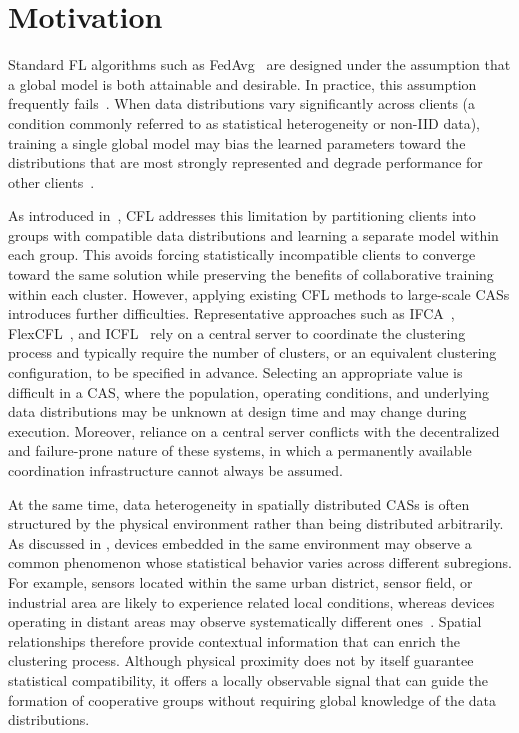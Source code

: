 \section{Motivation}
\label{sec:selforgfl-motivation}

Standard \gls{FL} algorithms such as 
 \gls{FedAvg}~\cite{DBLP:conf/aistats/McMahanMRHA17}
 are designed under the assumption that a global model 
 is both attainable and desirable.
%
In practice,
 this assumption frequently fails~\cite{DBLP:journals/ftml/KairouzMABBBBCC21}.
%
When data distributions vary significantly across clients
 (a condition commonly referred to as statistical heterogeneity or
 non-\gls{IID} data),
 training a single global model may bias the learned parameters toward
 the distributions that are most strongly represented and degrade
 performance for other clients~\cite{DBLP:conf/icde/LiDCH22}.

As introduced in~,
 \gls{CFL} addresses this limitation by partitioning clients
 into groups with compatible data distributions and learning a separate
 model within each group.
%
This avoids forcing statistically incompatible clients 
 to converge toward the same solution while preserving the benefits 
 of collaborative training within each cluster.
%
However, 
 applying existing \gls{CFL} methods to large-scale \glspl{CAS} 
 introduces further difficulties.
%
Representative approaches such as
 IFCA~\cite{DBLP:journals/tit/GhoshCYR22},
 FlexCFL~\cite{DBLP:journals/tpds/DuanLJWLCTR22}, and
 ICFL~\cite{DBLP:journals/tnn/YanTW24}
 rely on a central server to coordinate the clustering process 
 and typically require the number of clusters, 
 or an equivalent clustering configuration, to be specified in advance.
%
Selecting an appropriate value is difficult in a \gls{CAS}, 
 where the population, operating conditions, 
 and underlying data distributions may be unknown at design time 
 and may change during execution.
%
Moreover, 
 reliance on a central server conflicts with the decentralized
 and failure-prone nature of these systems, 
 in which a permanently available coordination infrastructure 
 cannot always be assumed.

At the same time, 
 data heterogeneity in spatially distributed \glspl{CAS} is often structured 
 by the physical environment rather than being distributed arbitrarily.
%
As discussed in ,
 devices embedded in the same environment may observe a common phenomenon
 whose statistical behavior varies across different subregions.
%
For example, 
 sensors located within the same urban district, sensor field, 
 or industrial area are likely to experience related local conditions, 
 whereas devices operating in distant areas may observe systematically different 
 ones~\cite{esterle2022deep}.
%
Spatial relationships therefore provide contextual information 
 that can enrich the clustering process.
%
Although physical proximity does not by itself guarantee statistical compatibility, 
 it offers a locally observable signal that can guide the formation 
 of cooperative groups without requiring global knowledge of the data distributions.

